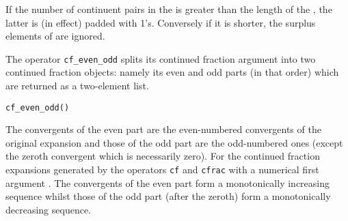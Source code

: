 If the number of continuent pairs in the 
is greater than the length of the , the latter is
(in effect) padded with 1's. Conversely if it is shorter, the surplus
elements of  are ignored.

\hypertarget{operator:CF_EVEN_ODD}{}
The operator \texttt{cf\_even\_odd}
 splits its continued fraction argument
 into two continued fraction objects: namely its even and
odd parts (in that order) which are returned as a two-element list.
\begin{syntaxtable}
  \texttt{cf\_even\_odd(}\texttt{)}
\end{syntaxtable}
The convergents of the even part are the even-numbered convergents of the
original expansion and those of the odd part are the odd-numbered ones
(except the zeroth convergent which is necessarily zero).  For the continued
fraction expansions generated by the operators \texttt{cf} and
\texttt{cfrac} with a numerical first argument . The convergents of
the even part form a monotonically increasing sequence whilst those of the
odd part (after the zeroth) form a monotonically decreasing sequence.

